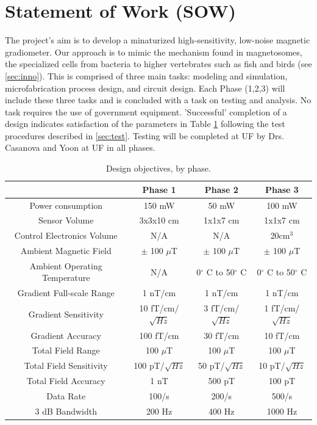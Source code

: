 

\section{Statement of Work (SOW)}
The project's aim is to develop a minaturized high-sensitivity, low-noise magnetic gradiometer. Our approach is to mimic the mechanism found in magnetosomes, the specialized cells from bacteria to higher vertebrates such as fish and birds (see \ref{sec:inno}). This is comprised of three main tasks: modeling and simulation, microfabrication process design, and circuit design. Each Phase (1,2,3) will include these three tasks and is concluded with  a task on testing and analysis. No task requires the use of government equipment. 'Successful' completion of a design indicates satisfaction of the parameters in Table \ref{table:obj} following the test procedures described in \ref{sec:test}. Testing will be completed at UF by Drs. Casanova and Yoon at UF in all phases.

\begin{table}[h!]
\centering
  \begin{tabular}{|c||c|c|c|}
    \hline
     & Phase 1 & Phase 2 & Phase 3 \\
    \hline
    \hline
    Power consumption & 150 mW & 50 mW & 100 mW \\
    \hline
    Sensor Volume & 3x3x10 cm & 1x1x7 cm & 1x1x7 cm \\
    \hline
    Control Electronics Volume  & N/A & N/A & 20cm$^3$ \\
    \hline
    Ambient Magnetic Field & $\pm$ 100 $\mu$T & $\pm$ 100 $\mu$T & $\pm$ 100 $\mu$T \\
    \hline
    Ambient Operating Temperature & N/A & 0$^{\circ}$ C to 50$^{\circ}$ C & 0$^{\circ}$ C to 50$^{\circ}$ C \\
    \hline
    Gradient Full-scale Range & 1 nT/cm & 1 nT/cm & 1 nT/cm \\
    \hline
    Gradient Sensitivity & 10 fT/cm/$\sqrt{Hz}$ & 3 fT/cm/$\sqrt{Hz}$  & 1 fT/cm/$\sqrt{Hz}$ \\
    \hline
    Gradient Accuracy & 100 fT/cm & 30 fT/cm & 10 fT/cm \\
    \hline
    Total Field Range & 100 $\mu$T & 100 $\mu$T & 100 $\mu$T \\
    \hline
    Total Field Sensitivity & 100 pT/$\sqrt{Hz}$ & 50 pT/$\sqrt{Hz}$  &  10 pT/$\sqrt{Hz}$ \\
    \hline
    Total Field Accuracy & 1 nT & 500 pT & 100 pT \\
    \hline
    Data Rate & 100/s & 200/s & 500/s \\
    \hline
    3 dB Bandwidth & 200 Hz & 400 Hz & 1000 Hz\\
    \hline
  \end{tabular}
\caption{Design objectives, by phase.}
\label{table:obj}
\end{table}

